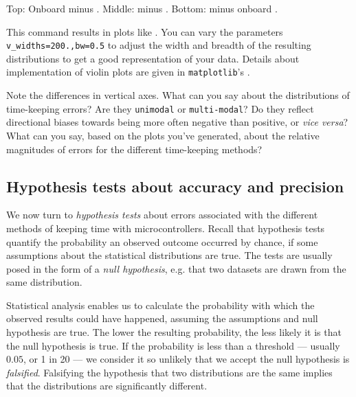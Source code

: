 \begin{enumerate}
\begin{marginfigure}[0.cm]
\begin{center}
{		Top: Onboard \rtc minus  \rtc. Middle: \ntp minus  \rtc. Bottom: \ntp minus onboard \rtc. }
	\end{center}
\end{marginfigure}
	This command results in plots like .
	You can vary the parameters \lstinline{v_widths=200.,bw=0.5} to adjust the width and breadth of the resulting distributions to get a good representation of your data.
	Details about implementation of violin plots are given in \lstinline{matplotlib}'s .
	
	Note the differences in vertical axes. 
	What can you say about the distributions of time-keeping errors?
	Are they \texttt{unimodal} or \texttt{multi-modal}?
	Do they reflect directional biases towards being more often negative than positive, or \textit{vice versa}?
	What can you say, based on the plots you've generated, about the relative magnitudes of errors for the different time-keeping methods?
	
\end{enumerate}

\subsection{Hypothesis tests about \rtc accuracy and precision}
We now turn to \emph{hypothesis tests} about errors associated with the different methods of keeping time with microcontrollers. 
Recall that hypothesis tests quantify the probability an observed outcome occurred by chance, if some assumptions about the statistical distributions are true.
The tests are usually posed in the form of a \emph{null hypothesis}, e.g. that two datasets are drawn from the same distribution. 

Statistical analysis enables us to calculate the probability with which the observed results could have happened, assuming the assumptions and null hypothesis are true. 
The lower the resulting probability, the less likely it is that the null hypothesis is true.
If the probability is less than a threshold --- usually $0.05$, or 1 in 20 --- we consider it so unlikely that we accept the null hypothesis is \emph{falsified}.
Falsifying the hypothesis that two distributions are the same implies that the distributions are significantly different.

